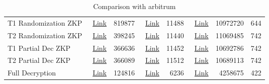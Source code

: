 \begin{table}[t]
\begin{tabular}{|l|r|r|r|r|r|r|r|}
		T1 Randomization ZKP &~\href{https://kovan.etherscan.io/tx/0x30e8ccff5af6f3489ba2dc11e3198f0216487f380aa2a66ddf97e94650490e88}{Link} &819877 &  ~\href{https://kovan.etherscan.io/tx/0xc08cc82908b7e87e8ddc75695c4f29c3bce3d9a8caced144f003c59e23f4690e}{Link}&  11488&  ~\href{https://explorer.offchainlabs.com/#/tx/0xe3d1ba8bc653397dd67f3bfb602db0acce617668dc2ae2f30e038b4137a60e24}{Link}& 10972720& 644\\  \cline{1-8}
		
		T2 Randomization ZKP & ~\href{https://kovan.etherscan.io/tx/0x6dd05a76c771089144583a685c2fb9a6b566a626aa86b568230faf83268fdd92}{Link}& 398245 & ~\href{https://kovan.etherscan.io/tx/0xd790b2edd8800a183068b3253d7e5b00e57d850bce8d9b8572494539b58c7e3c}{Link} &11440& ~\href{https://explorer.offchainlabs.com/#/tx/0x71535a6b6d0124cbd61a4993e5e831cc4ba151eec60b1c368a79686f3f5bc1f4}{Link} & 11069485 & 742 \\  \cline{1-8}
		
		T1 Partial Dec ZKP &~\href{https://kovan.etherscan.io/tx/0x477b3e6b645cc672bbbe99ea3e7fa227962a3e1222071c266442a5ab8366e1bb}{Link} &366636 & ~\href{https://kovan.etherscan.io/tx/0xdd0ffc715dc5733bee36fd99d51898cf978de27ece76777099c4570929039a25}{Link} & 11452& ~\href{https://explorer.offchainlabs.com/#/tx/0x9f7fba14177790f6dad6ad9bb0ec3017803b466a27182768b11163162a3961c3}{Link} & 10692786& 742\\  \cline{1-8}
		
		T2 Partial Dec ZKP &~\href{https://kovan.etherscan.io/tx/0x59a6282197cbd71b2c25cd5f3547b41ca7baf33322088f35273c97fce5cf8b56}{Link} &366089 & ~\href{https://kovan.etherscan.io/tx/0xb2a71505f192dd2119634ddd69070c52eb3a3d993aeb632ea8f823eb62f26e84}{Link} & 11512&  ~\href{https://explorer.offchainlabs.com/#/tx/0x724578f12940ebd653613c5037576540ce129ef277e4db67aff135711327e8f8}{Link} & 10689113& 742\\  \cline{1-8}
		
		Full Decryption & ~\href{https://kovan.etherscan.io/tx/0x172804db2abcef274dedfad8f31f84a0bb26c87826842589537f1d511402b282}{Link} & 124816 &  ~\href{https://kovan.etherscan.io/tx/0x10788165eacbbe25066c163fa0cf7a5af07da32c05af001d0f05ad8946974c6e}{Link}& 6236& ~\href{https://explorer.offchainlabs.com/#/tx/0x3515cc045805f2f9af9f378f4725ab4845679ca15ecd2e86758f8d53eb9a7353}{Link} & 4258675 & 422\\  \hline
	\end{tabular}
	\caption{Comparison with arbitrum} 
	\label{tab:arbitrum}
\end{table}